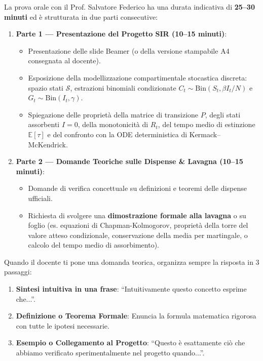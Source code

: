 \documentclass[11pt, a4paper]{report}
\theoremstyle{plain}
\theoremstyle{definition}
\theoremstyle{remark}
\newcommand{\1}{\mathbf{1}}
\begin{document}
La prova orale con il Prof. Salvatore Federico ha una durata indicativa di \textbf{25--30 minuti} ed è strutturata in due parti consecutive:

\begin{enumerate}
    \item \textbf{Parte 1 — Presentazione del Progetto SIR (10--15 minuti)}:
    \begin{itemize}
        \item Presentazione delle slide Beamer (o della versione stampabile A4 consegnata al docente).
        \item Esposizione della modellizzazione compartimentale stocastica discreta: spazio stati $\mathcal{S}$, estrazioni binomiali condizionate $C_t \sim \text{Bin}(S_t, \beta I_t/N)$ e $G_t \sim \text{Bin}(I_t, \gamma)$.
        \item Spiegazione delle proprietà della matrice di transizione $P$, degli stati assorbenti $I=0$, della monotonicità di $R_t$, del tempo medio di estinzione $\mathbb{E}[\tau]$ e del confronto con la ODE deterministica di Kermack--McKendrick.
    \end{itemize}
    
    \item \textbf{Parte 2 — Domande Teoriche sulle Dispense \& Lavagna (10--15 minuti)}:
    \begin{itemize}
        \item Domande di verifica concettuale su definizioni e teoremi delle dispense ufficiali.
        \item Richiesta di svolgere una \textbf{dimostrazione formale alla lavagna} o su foglio (es. equazioni di Chapman-Kolmogorov, proprietà della torre del valore atteso condizionale, conservazione della media per martingale, o calcolo del tempo medio di assorbimento).
    \end{itemize}
\end{enumerate}

\begin{spiegazione}
Quando il docente ti pone una domanda teorica, organizza sempre la risposta in 3 passaggi:
\begin{enumerate}
    \item \textbf{Sintesi intuitiva in una frase}: ``Intuitivamente questo concetto esprime che...''.
    \item \textbf{Definizione o Teorema Formale}: Enuncia la formula matematica rigorosa con tutte le ipotesi necessarie.
    \item \textbf{Esempio o Collegamento al Progetto}: ``Questo è esattamente ciò che abbiamo verificato sperimentalmente nel progetto quando...''.
\end{enumerate}
\end{spiegazione}
\end{document}
